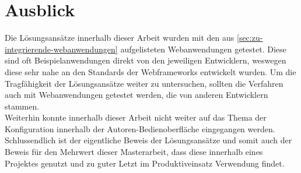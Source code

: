 \section{Ausblick}
Die Lösungsansätze innerhalb dieser Arbeit wurden mit den aus \autoref{sec:zu-integrierende-webanwendungen} aufgelisteten Webanwendungen getestet. Diese sind oft Beispielanwendungen direkt von den jeweiligen Entwicklern, weswegen diese sehr nahe an den Standards der Webframeworks entwickelt wurden. Um die Tragfähigkeit der Lösungsansätze weiter zu untersuchen, sollten die Verfahren auch mit Webanwendungen getestet werden, die von anderen Entwicklern stammen. \\
Weiterhin konnte innerhalb dieser Arbeit nicht weiter auf das Thema der Konfiguration innerhalb der Autoren-Bedienoberfläche eingegangen werden. \\
Schlussendlich ist der eigentliche Beweis der Lösungsansätze und somit auch der Beweis für den Mehrwert dieser Masterarbeit, dass diese innerhalb eines Projektes genutzt und zu guter Letzt im Produktiveinsatz Verwendung findet.